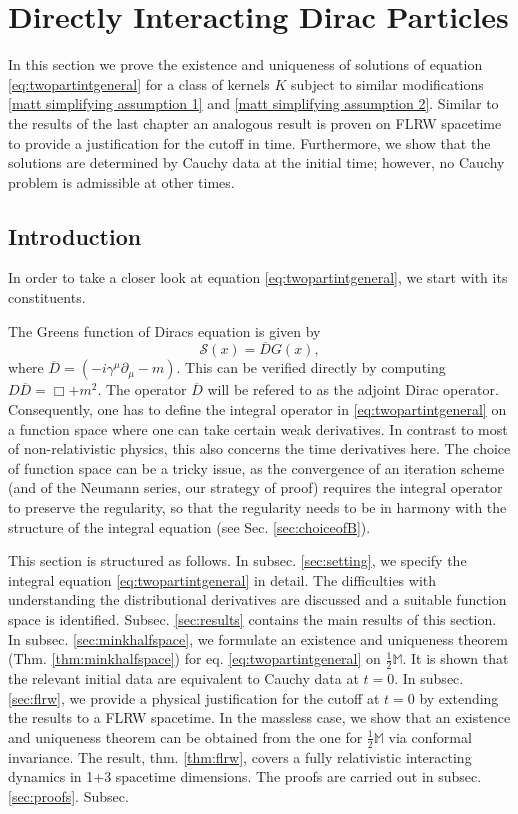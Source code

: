\documentclass[b5paper,draft,openbib,12pt]{memoir}
\newcommand{\M}{\mathbb{M}}
\begin{document}
\section{Directly Interacting Dirac Particles}\label{sec:direct dirac}

In this section we prove the existence and uniqueness 
of solutions of equation \eqref{eq:twopartintgeneral}
for a class of kernels \(K\)
subject to similar modifications \ref{matt simplifying assumption 1}
and \ref{matt simplifying assumption 2}.
Similar to the results of the last chapter an analogous 
result is proven on FLRW spacetime to provide a justification 
for the cutoff in time.
Furthermore, we show that the solutions 
are determined by Cauchy data at the initial time; however, 
no Cauchy problem is admissible at other times. 
\subsection{Introduction}

In order to take a closer look at equation \eqref{eq:twopartintgeneral},
we start with its constituents.

The Greens function of Diracs equation is given by 
\begin{equation}
	\mathscr{S}(x)= \overline{D}G(x),
\end{equation}
where \(\overline{D} = (-i \gamma^\mu \partial_\mu - m)\).
This can be verified directly by computing 
\(D\overline{D}=\Box +m^2\).
The operator \(\overline{D}\)
will be refered to as the adjoint Dirac operator.
Consequently, one has to define the integral operator in 
\eqref{eq:twopartintgeneral} on a function space where one can take 
certain weak derivatives. In contrast to most of non-relativistic 
physics, this also concerns the time derivatives here. The choice 
of function space can be a tricky issue, as the convergence of an 
iteration scheme (and of the Neumann series, our strategy of proof) 
requires the integral operator to preserve the regularity, so 
that the regularity needs to be in harmony with the structure 
of the integral equation (see Sec. \ref{sec:choiceofB}).


This section is structured as follows. 
In subsec. \ref{sec:setting}, we specify the integral equation 
\eqref{eq:twopartintgeneral} in detail. The difficulties 
with understanding 
the distributional derivatives are discussed and a suitable 
function space is identified. Subsec. \ref{sec:results} contains 
the main results of this section. 
In subsec. \ref{sec:minkhalfspace}, we formulate 
an existence and uniqueness theorem (Thm. \ref{thm:minkhalfspace}) 
for eq. \eqref{eq:twopartintgeneral} on $\frac{1}{2}\M$. 
It is shown that 
the relevant initial data are equivalent to Cauchy data at $t=0$. 
In subsec. \ref{sec:flrw}, we provide a physical justification for 
the cutoff at $t=0$ by extending the results to a FLRW spacetime. 
In the massless case, we show that an existence and uniqueness 
theorem can be obtained from the one for $\frac{1}{2}\M$ via 
conformal invariance. The result, thm. \ref{thm:flrw}, covers a 
fully relativistic interacting dynamics in 1+3 spacetime 
dimensions. The proofs are carried out in subsec. \ref{sec:proofs}. 
Subsec.
\end{document}
